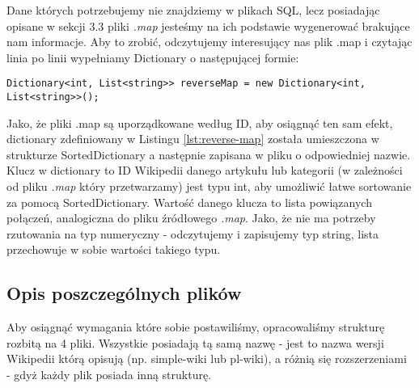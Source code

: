 Dane których potrzebujemy nie znajdziemy w plikach SQL, lecz posiadając opisane w sekcji 3.3 pliki \textit{.map} jesteśmy na ich podstawie wygenerować brakujące nam informacje.
Aby to zrobić, odczytujemy interesujący nas plik .map i czytając linia po linii wypełniamy Dictionary o następującej formie:

\begin{lstlisting}[caption={Dictionary przechowujące odwzorowanie odwrotne}, label=lst:reverse-map]
Dictionary<int, List<string>> reverseMap = new Dictionary<int, List<string>>();
\end{lstlisting}

Jako, że pliki .map są uporządkowane według ID, aby osiągnąć ten sam efekt, dictionary zdefiniowany w Listingu \ref{lst:reverse-map} została umieszczona w strukturze SortedDictionary a następnie zapisana w pliku o odpowiedniej nazwie. 
Klucz w dictionary to ID Wikipedii danego artykułu lub kategorii (w zależności od pliku \textit{.map} który przetwarzamy) jest typu int, aby umożliwić łatwe sortowanie za pomocą SortedDictionary. Wartość danego klucza to lista powiązanych połączeń, analogiczna do pliku źródłowego \textit{.map}. Jako, że nie ma potrzeby rzutowania na typ numeryczny - odczytujemy i zapisujemy typ string, lista przechowuje w sobie wartości takiego typu.

\subsection{Opis poszczególnych plików}
Aby osiągnąć wymagania które sobie postawiliśmy, opracowaliśmy strukturę rozbitą na 4 pliki. Wszystkie posiadają tą samą nazwę - jest to nazwa wersji Wikipedii którą opisują (np. simple-wiki lub pl-wiki), a różnią się rozszerzeniami - gdyż każdy plik posiada inną strukturę.

